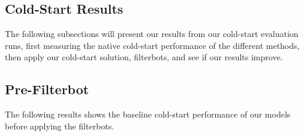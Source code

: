








\subsection{Cold-Start Results}

The following subsections will present our results from our cold-start evaluation runs, first measuring the native cold-start performance
of the different methods, then apply our cold-start solution, filterbots, and see if our results improve.

\subsection{Pre-Filterbot}

The following results shows the baseline cold-start performance of our models before applying the filterbots.



